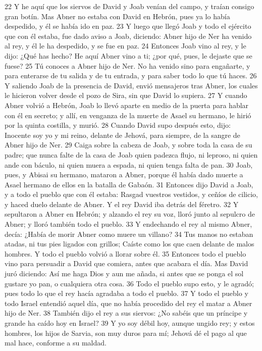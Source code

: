22 Y he aquí que los siervos de David y Joab venían del campo, y traían consigo gran botín. Mas Abner no estaba con David en Hebrón, pues ya lo había despedido, y él se había ido en paz.
23 Y luego que llegó Joab y todo el ejército que con él estaba, fue dado aviso a Joab, diciendo: Abner hijo de Ner ha venido al rey, y él le ha despedido, y se fue en paz.
24 Entonces Joab vino al rey, y le dijo: ¿Qué has hecho? He aquí Abner vino a ti; ¿por qué, pues, le dejaste que se fuese?
25 Tú conoces a Abner hijo de Ner. No ha venido sino para engañarte, y para enterarse de tu salida y de tu entrada, y para saber todo lo que tú haces.
26 Y saliendo Joab de la presencia de David, envió mensajeros tras Abner, los cuales le hicieron volver desde el pozo de Sira, sin que David lo supiera.
27 Y cuando Abner volvió a Hebrón, Joab lo llevó aparte en medio de la puerta para hablar con él en secreto; y allí, en venganza de la muerte de Asael su hermano, le hirió por la quinta costilla, y murió.
28 Cuando David supo después esto, dijo: Inocente soy yo y mi reino, delante de Jehová, para siempre, de la sangre de Abner hijo de Ner.
29 Caiga sobre la cabeza de Joab, y sobre toda la casa de su padre; que nunca falte de la casa de Joab quien padezca flujo, ni leproso, ni quien ande con báculo, ni quien muera a espada, ni quien tenga falta de pan.
30 Joab, pues, y Abisai su hermano, mataron a Abner, porque él había dado muerte a Asael hermano de ellos en la batalla de Gabaón.
31 Entonces dijo David a Joab, y a todo el pueblo que con él estaba: Rasgad vuestros vestidos, y ceñíos de cilicio, y haced duelo delante de Abner. Y el rey David iba detrás del féretro.
32 Y sepultaron a Abner en Hebrón; y alzando el rey su voz, lloró junto al sepulcro de Abner; y lloró también todo el pueblo. 
33 Y endechando el rey al mismo Abner, decía:
¿Había de morir Abner como muere un villano?
34 Tus manos no estaban atadas, ni tus pies ligados con grillos;
Caíste como los que caen delante de malos hombres.
Y todo el pueblo volvió a llorar sobre él.
35 Entonces todo el pueblo vino para persuadir a David que comiera, antes que acabara el día. Mas David juró diciendo: Así me haga Dios y aun me añada, si antes que se ponga el sol gustare yo pan, o cualquiera otra cosa.
36 Todo el pueblo supo esto, y le agradó; pues todo lo que el rey hacía agradaba a todo el pueblo. 
37 Y todo el pueblo y todo Israel entendió aquel día, que no había procedido del rey el matar a Abner hijo de Ner.
38 También dijo el rey a sus siervos: ¿No sabéis que un príncipe y grande ha caído hoy en Israel?
39 Y yo soy débil hoy, aunque ungido rey; y estos hombres, los hijos de Sarvia, 
son muy duros para mí; Jehová dé el pago al que mal hace, conforme a su maldad.

